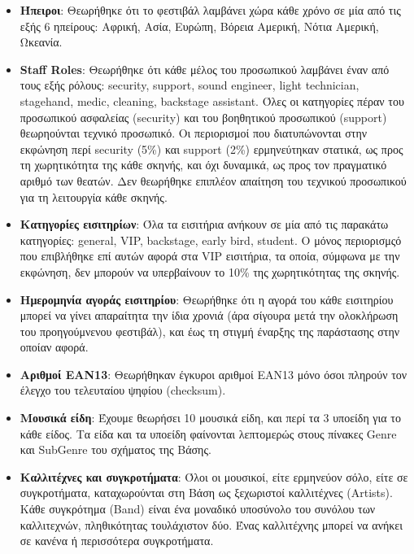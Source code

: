 \documentclass[13pt]{extarticle}
\begin{document}
\begin{itemize}
    \item \textbf{Ήπειροι}: Θεωρήθηκε ότι το φεστιβάλ λαμβάνει χώρα κάθε χρόνο σε μία από τις εξής 6 ηπείρους: Αφρική, Ασία, Ευρώπη, Βόρεια Αμερική, Νότια Αμερική, Ωκεανία.

    \item \textbf{Staff Roles}: Θεωρήθηκε ότι κάθε μέλος του προσωπικού λαμβάνει έναν από τους εξής ρόλους: security, support, sound engineer, light technician, stagehand, medic, cleaning, backstage assistant. Όλες οι κατηγορίες πέραν του προσωπικού ασφαλείας (security) και του βοηθητικού προσωπικού (support) θεωρηούνται τεχνικό προσωπικό. Οι περιορισμοί που διατυπώνονται στην εκφώνηση περί security (5\%) και support (2\%) ερμηνεύτηκαν στατικά, ως προς τη χωρητικότητα της κάθε σκηνής, και όχι δυναμικά, ως προς τον πραγματικό αριθμό των θεατών. Δεν θεωρήθηκε επιπλέον απαίτηση του τεχνικού προσωπικού για τη λειτουργία κάθε σκηνής.

    \item \textbf{Κατηγορίες εισιτηρίων}: Όλα τα εισιτήρια ανήκουν σε μία από τις παρακάτω κατηγορίες: general, VIP, backstage, early bird, student. Ο μόνος περιορισμςό που επιβλήθηκε επί αυτών αφορά στα VIP εισιτήρια, τα οποία, σύμφωνα με την εκφώνηση, δεν μπορούν να υπερβαίνουν το 10\% της χωρητικότητας της σκηνής.
    
    \item \textbf{Ημερομηνία αγοράς εισιτηρίου}: Θεωρήθηκε ότι η αγορά του κάθε εισιτηρίου μπορεί να γίνει απαραίτητα την ίδια χρονιά (άρα σίγουρα μετά την ολοκλήρωση του προηγούμνενου φεστιβάλ), και έως τη στιγμή έναρξης της παράστασης στην οποίαν αφορά.
    
    \item \textbf{Αριθμοί EAN13}: Θεωρήθηκαν έγκυροι αριθμοί ΕΑΝ13 μόνο όσοι πληρούν τον έλεγχο του τελευταίου ψηφίου (checksum).

    \item \textbf{Μουσικά είδη}: Έχουμε θεωρήσει 10 μουσικά είδη, και περί τα 3 υποείδη για το κάθε είδος. Τα είδα και τα υποείδη φαίνονται λεπτομερώς στους πίνακες Genre και SubGenre του σχήματος της Βάσης.

    \item \textbf{Καλλιτέχνες και συγκροτήματα}: Όλοι οι μουσικοί, είτε ερμηνεύον σόλο, είτε σε συγκροτήματα, καταχωρούνται στη Βάση ως ξεχωριστοί καλλιτέχνες (Artists). Κάθε συγκρότημα (Band) είναι ένα μοναδικό υποσύνολο του συνόλου των καλλιτεχνών, πληθικότητας τουλάχιστον δύο. Ένας καλλιτέχνης μπορεί να ανήκει σε κανένα ή περισσότερα συγκροτήματα.


\end{itemize}
\end{document}
